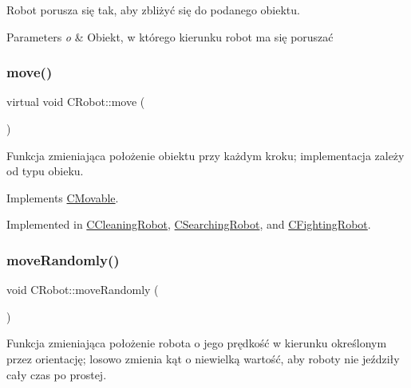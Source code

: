 Robot porusza się tak, aby zbliżyć się do podanego obiektu. 


\begin{DoxyParams}{Parameters}
{\em o} & Obiekt, w którego kierunku robot ma się poruszać \\
\hline
\end{DoxyParams}
\mbox{\label{class_c_robot_a1de9be879213eadf7ded27caedb84598}} 
\subsubsection{\texorpdfstring{move()}{move()}}
{\footnotesize\ttfamily virtual void C\+Robot\+::move (\begin{DoxyParamCaption}{ }\end{DoxyParamCaption})\hspace{0.3cm}{\ttfamily [pure virtual]}}



Funkcja zmieniająca położenie obiektu przy każdym kroku; implementacja zależy od typu obieku. 



Implements \mbox{\hyperlink{class_c_movable_a8e66e106f13362d24462ce0c9d0431af}{C\+Movable}}.



Implemented in \mbox{\hyperlink{class_c_cleaning_robot_a1ad227a5f3508a8e78fcecae7d3de53b}{C\+Cleaning\+Robot}}, \mbox{\hyperlink{class_c_searching_robot_a2c2150e7fd1cefbb5851e039cd76572f}{C\+Searching\+Robot}}, and \mbox{\hyperlink{class_c_fighting_robot_af644acbba178e256566e9dbd230aa4db}{C\+Fighting\+Robot}}.

\mbox{\label{class_c_robot_a9a819529f710ae6d9dc376c78e6c5657}} 
\subsubsection{\texorpdfstring{move\+Randomly()}{moveRandomly()}}
{\footnotesize\ttfamily void C\+Robot\+::move\+Randomly (\begin{DoxyParamCaption}{ }\end{DoxyParamCaption})}



Funkcja zmieniająca położenie robota o jego prędkość w kierunku określonym przez orientację; losowo zmienia kąt o niewielką wartość, aby roboty nie jeździły cały czas po prostej. 

